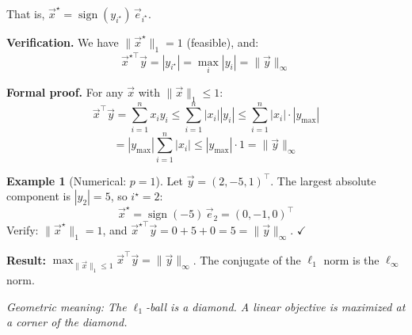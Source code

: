 \documentclass[10pt, twocolumn]{article}
\theoremstyle{definition}
\newtheorem{example}{Example}
\theoremstyle{plain}
\DeclareMathOperator{\sign}{sign}
\begin{document}
That is, $\vec{x}^\star = \sign(y_{i^\star}) \, \vec{e}_{i^\star}$.

\textbf{Verification.} We have $\|\vec{x}^\star\|_1 = 1$ (feasible), and:
\[
    \vec{x}^{\star\top} \vec{y} = |y_{i^\star}| = \max_i |y_i| = \|\vec{y}\|_\infty
\]

\textbf{Formal proof.} For any $\vec{x}$ with $\|\vec{x}\|_1 \le 1$:
\[
    \vec{x}^\top \vec{y} = \sum_{i=1}^{n} x_i y_i \le \sum_{i=1}^{n} |x_i| |y_i| \le \sum_{i=1}^{n} |x_i| \cdot |y_{\max}|
\]
\[
    = |y_{\max}| \sum_{i=1}^{n} |x_i| \le |y_{\max}| \cdot 1 = \|\vec{y}\|_\infty
\]

\begin{example}[Numerical: $p = 1$]
Let $\vec{y} = (2, -5, 1)^\top$. The largest absolute component is $|y_2| = 5$, so $i^\star = 2$:
\[
    \vec{x}^\star = \sign(-5) \, \vec{e}_2 = (0, -1, 0)^\top
\]
Verify: $\|\vec{x}^\star\|_1 = 1$, and $\vec{x}^{\star\top} \vec{y} = 0 + 5 + 0 = 5 = \|\vec{y}\|_\infty$. $\checkmark$
\end{example}

\begin{tcolorbox}[colframe=black!50]
\textbf{Result:} $\displaystyle\max_{\|\vec{x}\|_1 \le 1} \vec{x}^\top \vec{y} = \|\vec{y}\|_\infty$. The conjugate of the $\ell_1$ norm is the $\ell_\infty$ norm.
\end{tcolorbox}

\textit{Geometric meaning: The $\ell_1$-ball is a diamond. A linear objective is maximized at a corner of the diamond.}

\begin{center}
\end{center}
\end{document}
